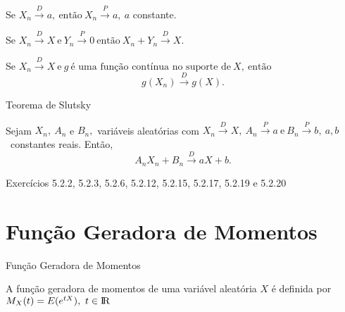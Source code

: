 \documentclass[12pt]{beamer}
\begin{document}
\begin{frame}{}
\begin{Teorema}
\justifying
Se $X_{n} \overset{D}{\rightarrow} a,~\text{então}~X_{n} \overset{P}{\rightarrow} a,~a$ constante.
\end{Teorema}
\end{frame}

\begin{frame}{}
\begin{Teorema}
\justifying
Se $X_{n} \overset{D}{\rightarrow} X~\text{e}~Y_{n} \overset{P}{\rightarrow} 0~\text{então}~X_{n}+Y_{n} \overset{D}{\rightarrow} X.$
\end{Teorema}
\end{frame}

\begin{frame}{}
\begin{Teorema}
\justifying
Se $X_{n} \overset{D}{\rightarrow} X~\text{e}~g~\text{é uma função contínua no suporte de}~X,~\text{então}~$ $$g(X_{n}) \overset{D}{\rightarrow} g(X).$$
\end{Teorema}
\end{frame}

\begin{frame}{Teorema de Slutsky}
\begin{Teorema}
\justifying
Sejam $X_{n},~A_{n}$ e $B_{n},$ variáveis aleatórias com $X_{n} \overset{D}{\rightarrow} X,~A_{n} \overset{P}{\rightarrow} a~\text{e}~B_{n} \overset{P}{\rightarrow} b,~a,b$~constantes reais. Então, $$A_{n}X_{n}+B_{n} \overset{D}{\rightarrow} aX+b.$$
\end{Teorema}
\end{frame}

\begin{frame}{}
\begin{block}{\Home}
	\nocite{hogg}
\justifying
Exercícios 5.2.2, 5.2.3, 5.2.6, 5.2.12, 5.2.15, 5.2.17, 5.2.19 e 5.2.20
\end{block}
\end{frame}

\section{Função Geradora de Momentos}
\begin{frame}{Função Geradora de Momentos}
	\begin{definicao}
		\justifying
		A função geradora de momentos de uma variável aleatória $X$ é definida por $M_{X}(t)=E(e^{tX}),~t\in \rm I\!R$
	\end{definicao}
\end{frame}
\end{document}
